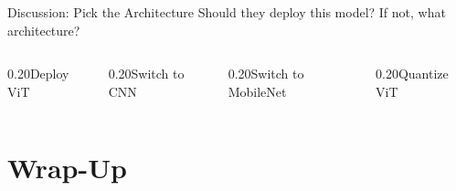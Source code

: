 \documentclass[aspectratio=169, 12pt]{beamer}
\begin{document}
\begin{frame}{Discussion: Pick the Architecture}
\vspace{0.3cm}
\alert{Should they deploy this model? If not, what architecture?}

\vspace{0.2cm}
\begin{columns}[c]
  \begin{column}{0.20\textwidth}\centering\footnotesize Deploy ViT\end{column}
  \begin{column}{0.20\textwidth}\centering\footnotesize Switch to CNN\end{column}
  \begin{column}{0.20\textwidth}\centering\footnotesize Switch to MobileNet\end{column}
  \begin{column}{0.20\textwidth}\centering\footnotesize Quantize ViT\end{column}
\end{columns}

\end{frame}

\section{Wrap-Up}
\end{document}

